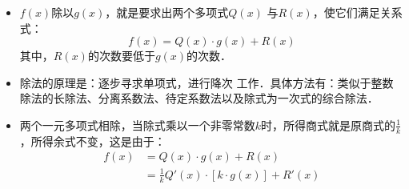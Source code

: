 \begin{itemize}
    \item $f(x)$除以$g(x)$，就是要求出两个多项式$Q(x)$
    与$R(x)$，使它们满足关系式：
    \[f (x) =Q (x) \cdot g (x) +R (x)\]
    其中，$R(x)$的次数要低于$g(x)$的次数．
    \item 除法的原理是：逐步寻求单项式，进行降次
    工作．具体方法有：类似于整数除法的长除法、分离系数法、待定系数法以及除式为一次式的综合除法．
    \item 两个一元多项式相除，当除式乘以一个非零常数$k$时，所得商式就是原商式的$\frac{1}{k}$，所得余式不变，这是由于：
\[\begin{split}
    f(x)&=Q(x)\cdot g(x)+R(x)\\
    &=\frac{1}{k}Q'(x)\cdot [k\cdot g(x)]+R'(x)
\end{split}\]    

\end{itemize}